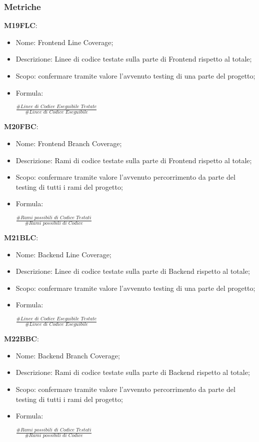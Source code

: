 \subsubsection{Metriche}
\textbf{M19FLC}:
  \begin{itemize}
    \item Nome: Frontend Line Coverage;
    \item Descrizione: Linee di codice testate sulla parte di Frontend rispetto al totale;
    \item Scopo: confermare tramite valore l'avvenuto testing di una parte del progetto;
    \item Formula:
    \begin{center}
    $ \frac{\textit{\#Linee di Codice Eseguibile Testate}}{\textit{\#Linee di Codice Eseguibile}}$
    \end{center}
  \end{itemize}
\textbf{M20FBC}:
  \begin{itemize}
    \item Nome: Frontend Branch Coverage;
    \item Descrizione: Rami di codice testate sulla parte di Frontend rispetto al totale;
    \item Scopo: confermare tramite valore l'avvenuto percorrimento da parte del testing di tutti i rami del progetto;
    \item Formula:
    \begin{center}
    $ \frac{\textit{\#Rami possibili di Codice Testati}}{\textit{\#Rami possibili di Codice}}$
    \end{center}
  \end{itemize}
\textbf{M21BLC}:
  \begin{itemize}
    \item Nome: Backend Line Coverage;
    \item Descrizione: Linee di codice testate sulla parte di Backend rispetto al totale;
    \item Scopo: confermare tramite valore l'avvenuto testing di una parte del progetto;
    \item Formula:
    \begin{center}
    $ \frac{\textit{\#Linee di Codice Eseguibile Testate}}{\textit{\#Linee di Codice Eseguibile}}$
    \end{center}
  \end{itemize}
\textbf{M22BBC}:
  \begin{itemize}
    \item Nome: Backend Branch Coverage;
    \item Descrizione: Rami di codice testate sulla parte di Backend rispetto al totale;
    \item Scopo: confermare tramite valore l'avvenuto percorrimento da parte del testing di tutti i rami del progetto;
    \item Formula:
    \begin{center}
    $ \frac{\textit{\#Rami possibili di Codice Testati}}{\textit{\#Rami possibili di Codice}}$
    \end{center}
  \end{itemize}



